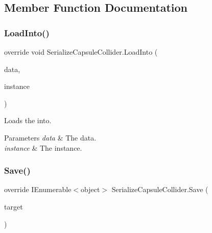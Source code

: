 \subsection{Member Function Documentation}
\mbox{\label{class_serialize_capsule_collider_ad5551346e6f64d17a17c65349ba4cd68}} 
\subsubsection{\texorpdfstring{Load\+Into()}{LoadInto()}}
{\footnotesize\ttfamily override void Serialize\+Capsule\+Collider.\+Load\+Into (\begin{DoxyParamCaption}\item[{object \mbox{[}$\,$\mbox{]}}]{data,  }\item[{Capsule\+Collider}]{instance }\end{DoxyParamCaption})\hspace{0.3cm}{\ttfamily [inline]}}



Loads the into. 


\begin{DoxyParams}{Parameters}
{\em data} & The data.\\
\hline
{\em instance} & The instance.\\
\hline
\end{DoxyParams}
\mbox{\label{class_serialize_capsule_collider_af02d52a90ac7718fee5f4775c3d441e6}} 
\subsubsection{\texorpdfstring{Save()}{Save()}}
{\footnotesize\ttfamily override I\+Enumerable$<$object$>$ Serialize\+Capsule\+Collider.\+Save (\begin{DoxyParamCaption}\item[{Capsule\+Collider}]{target }\end{DoxyParamCaption})\hspace{0.3cm}{\ttfamily [inline]}}



